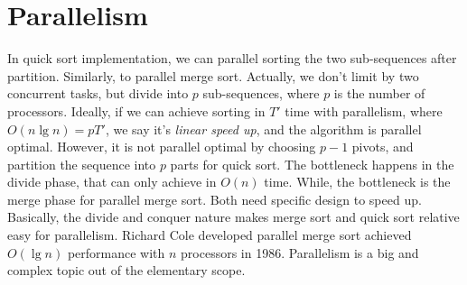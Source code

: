 \documentclass[b5paper]{article}
\begin{document}
\begin{Exercise}\label{ex:pairwise-fold}
\end{Exercise}

\begin{Answer}[ref = {ex:pairwise-fold}]
\end{Answer}

\section{Parallelism}
 

In quick sort implementation, we can parallel sorting the two sub-sequences after partition. Similarly, to parallel merge sort. Actually, we don't limit by two concurrent tasks, but divide into $p$ sub-sequences, where $p$ is the number of processors. Ideally, if we can achieve sorting in $T'$ time with parallelism, where $O(n \lg n) = p T'$, we say it's {\em linear speed up}, and the algorithm is parallel optimal. However, it is not parallel optimal by choosing $p - 1$ pivots, and partition the sequence into $p$ parts for quick sort. The bottleneck happens in the divide phase, that can only achieve in $O(n)$ time. While, the bottleneck is the merge phase for parallel merge sort. Both need specific design to speed up. Basically, the divide and conquer nature makes merge sort and quick sort relative easy for parallelism. Richard Cole developed parallel merge sort achieved $O(\lg n)$ performance with $n$ processors in 1986\cite{para-msort}. Parallelism is a big and complex topic out of the elementary scope\cite{para-msort}\cite{para-qsort}.
\end{document}

